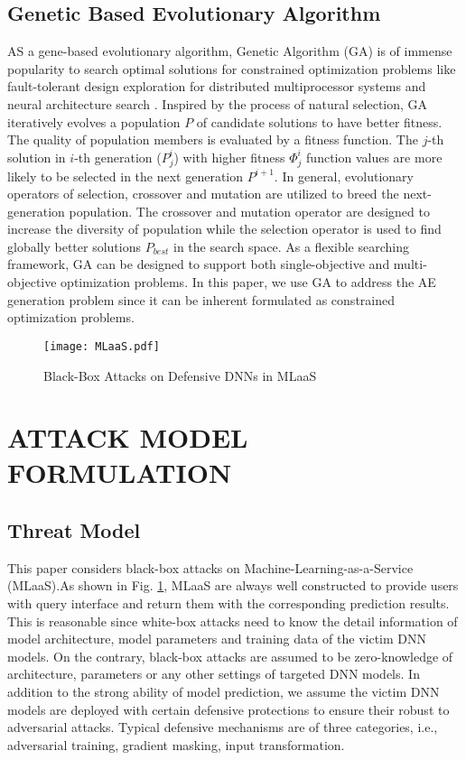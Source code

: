 \documentclass[lettersize,journal]{IEEEtran}
\begin{document}
\subsection{Genetic Based Evolutionary Algorithm}
AS a gene-based evolutionary algorithm, Genetic Algorithm (GA) is of immense popularity to search optimal solutions for constrained optimization problems like fault-tolerant design exploration for distributed multiprocessor systems \cite{DBLP:journals/tec/YuanCY20} and neural architecture search \cite{DBLP:journals/tec/ONeillXZ21}.  
Inspired by the process of natural selection, GA iteratively evolves a population $P$ of candidate solutions to have better fitness. The quality of population members is evaluated by a fitness function. The $j$-th solution in $i$-th generation ($P^i_j$) with higher fitness $\Phi^i_j$ function values are more likely to be selected in the next generation $P^{i+1}$. In general, evolutionary operators of selection, crossover and mutation are utilized to breed the next-generation population. The crossover and mutation operator are designed to increase the diversity of population while the selection operator is used to find globally better solutions $P_{best}$ in the search space. As a flexible searching framework, GA can be designed to support both single-objective and multi-objective optimization problems. In this paper, we use GA to address the AE generation problem since it can be inherent formulated as constrained optimization problems.  	

\begin{figure}[!b]
\centering
\texttt{[image: MLaaS.pdf]}
\caption{Black-Box Attacks on Defensive DNNs in MLaaS}  
\label{fig:MLaaS}
\end{figure}


\section{ATTACK MODEL FORMULATION}
\subsection{Threat Model}
This paper considers black-box attacks on Machine-Learning-as-a-Service (MLaaS).As shown in Fig. \ref{fig:MLaaS}, MLaaS are always well constructed to provide users with query interface and return them with the corresponding prediction results. This is reasonable since white-box attacks need to know the detail information of model architecture, model parameters and training data of the victim DNN models. On the contrary, black-box attacks are assumed to be zero-knowledge of architecture, parameters or any other settings of targeted DNN models. In addition to the strong ability of model prediction, we assume the victim DNN models are deployed with certain defensive protections to ensure their robust to adversarial attacks. Typical defensive mechanisms are of three categories, i.e., adversarial training, gradient masking, input transformation. 
\end{document}
